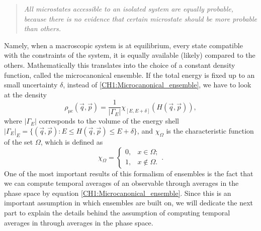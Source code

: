 \begin{quote}
\textit{All microstates accessible to an isolated system are equally probable, because there is no evidence that certain microstate should be more probable than others.}
\end{quote}
\indent Namely, when a macroscopic system is at equilibrium, every state compatible with the constraints of the system, it is equally available (likely) compared to the others. Mathematically this translates into the choice of a constant density function, called the microcanonical ensemble. If the total energy is fixed up to an small uncertainty $\delta$, instead of \eqref{CH1:Microcanonical_ensemble}, we have to look at the density
\begin{equation}
\rho_{\mathrm{\mu c}}(\vec{q},\vec{p}) = \frac{1}{\left|\Gamma_{E}\right|} \chi_{[E,E+\delta]}(H(\vec{q},\vec{p})),
\end{equation}
where $\left|\Gamma_{E}\right|$ corresponds to the volume of the energy shell $\left|\Gamma_{E}\right|_E = \{(\vec{q},\vec{p}): E\leq H(\vec{q},\vec{p}) \leq E+\delta \}$, and $\chi_{\Omega}$ is the characteristic function of the set $\Omega$, which is defined as
\begin{equation}
\chi_{\Omega} = \begin{cases} 0,&x\in \Omega;\\ 1 ,&x\not \in \Omega.\end{cases}.
\label{CH1:Characteristic_function}
\end{equation}
One of the most important results of this formalism of ensembles is the fact that we can compute temporal averages of an observable through averages in the phase space by equation \eqref{CH1:Microcanonical_ensemble}. Since this is an important assumption in which ensembles are built on, we will dedicate the next part to explain the details behind the assumption of computing temporal averages in through averages in the phase space.
